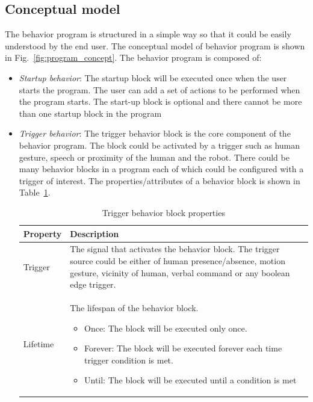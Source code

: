 \subsection{Conceptual model}
The behavior program is structured in a simple way so that it could be easily understood by the end user. The conceptual model of behavior program is shown in Fig.~\ref{fig:program_concept}. The behavior program is composed of:
\begin{itemize}
\item \emph{Startup behavior}: The startup block will be executed once when the user starts the program. The user can add a set of actions to be performed when the program starts. The start-up block is optional and there cannot be more than one startup block in the program
\item \emph{Trigger behavior}: The trigger behavior block is the core component of the behavior program. The block could be activated by a trigger such as human gesture, speech or proximity of the human and the robot. There could be many behavior blocks in a program each of which could be configured with a trigger of interest. The properties/attributes of a behavior block is shown in Table~\ref{table:behavior_block}. 
\begin{table}[H]
\centering
\small
\caption{Trigger behavior block properties}
\label{table:behavior_block}
\begin{tabular}{|l|p{11cm}|}
\hline
  \textbf{Property} & \textbf{Description}
  \tabularnewline \hline
  
  Trigger & The signal that activates the behavior block. The trigger source could be either of human presence/absence, motion gesture, vicinity of human, verbal command or any boolean edge trigger.
                                          \tabularnewline\hline
                                          
  Lifetime & The lifespan of the behavior block. \begin{itemize}[leftmargin=*,topsep={0pt},itemsep={0pt},partopsep={0pt},parsep={0pt}]
                                                                      \item Once: The block will be executed only once.
                                                                      \item Forever: The block will be executed forever each time trigger condition is met.
                                                                      \item Until: The block will be executed until a condition is met
                                                                   \end{itemize}
                                          \tabularnewline\hline
  

\end{tabular}
\end{table}
\end{itemize}

